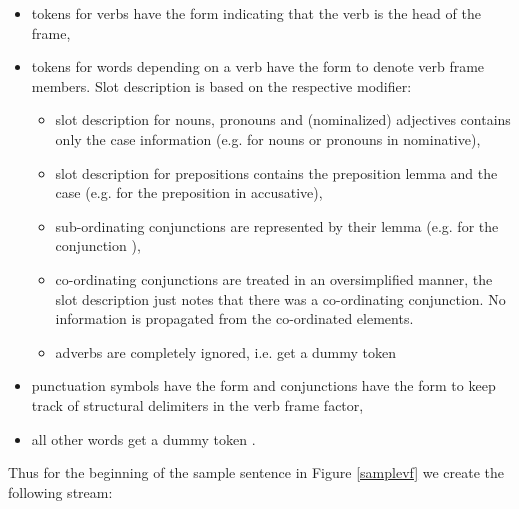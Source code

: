 \documentclass[10pt]{report}
\theoremstyle{plain}
\begin{document}
{{\begin{itemize}

\item tokens for verbs have the form  indicating that the verb is the head of the frame,

\item tokens for words depending on a verb have the form  to denote verb frame members. Slot description is based on the
  respective modifier:
\begin{itemize}

\item slot description for nouns, pronouns and (nominalized) adjectives contains
  only the case information (e.g.  for nouns or pronouns in
  nominative),

\item slot description for prepositions contains the preposition lemma and the
  case (e.g.  for the preposition  in accusative),

\item sub-ordinating conjunctions are represented by their lemma (e.g.
   for the conjunction ),

\item co-ordinating conjunctions are treated in an oversimplified manner, the slot
  description just notes that there was a co-ordinating conjunction. No
  information is propagated from the co-ordinated elements.

\item adverbs are completely ignored, i.e. get a dummy token \text{---}
\end{itemize}

\item punctuation symbols have the form  and
  conjunctions have the form  to
  keep track of structural delimiters in the verb frame factor,

\item all other words get a dummy token \text{---}.
\end{itemize}

Thus for the beginning of the sample sentence in Figure \ref{samplevf}
 we create the following stream:

}}
\end{document}
